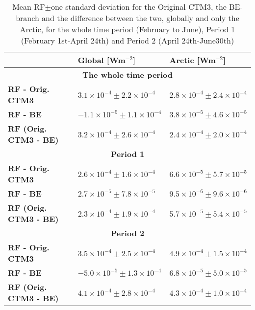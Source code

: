 \begin{table}[h]
\begin{tabular}{|l|l|l|}
\hline
\textbf{}                     & \textbf{Global {[}Wm$^{-2}${]}}        & \textbf{Arctic {[}Wm$^{-2}${]}}       \\ \hline
\multicolumn{3}{|c|}{\textbf{The whole time period}}                                                           \\ \hline
\textbf{RF - Orig. CTM3}      & $3.1\times10^{-4}\pm2.2\times10^{-4}$  & $2.8\times10^{-4}\pm2.4\times10^{-4}$ \\
\textbf{RF - BE}              & $-1.1\times10^{-5}\pm1.1\times10^{-4}$ & $3.8\times10^{-5}\pm4.6\times10^{-5}$ \\
\textbf{RF (Orig. CTM3 - BE)} & $3.2\times10^{-4}\pm2.6\times10^{-4}$  & $2.4\times10^{-4}\pm2.0\times10^{-4}$ \\ \hline
\multicolumn{3}{|c|}{\textbf{Period 1}}                                                                        \\ \hline
\textbf{RF - Orig. CTM3}      & $2.6\times10^{-4}\pm1.6\times10^{-4}$  & $6.6\times10^{-5}\pm5.7\times10^{-5}$ \\
\textbf{RF - BE}              & $2.7\times10^{-5}\pm7.8\times10^{-5}$  & $9.5\times10^{-6}\pm9.6\times10^{-6}$ \\
\textbf{RF (Orig. CTM3 - BE)} & $2.3\times10^{-4}\pm1.9\times10^{-4}$  & $5.7\times10^{-5}\pm5.4\times10^{-5}$ \\ \hline
\multicolumn{3}{|c|}{\textbf{Period 2}}                                                                        \\ \hline
\textbf{RF - Orig. CTM3}      & $3.5\times10^{-4}\pm2.5\times10^{-4}$  & $4.9\times10^{-4}\pm1.5\times10^{-4}$ \\
\textbf{RF - BE}              & $-5.0\times10^{-5}\pm1.3\times10^{-4}$ & $6.8\times10^{-5}\pm5.0\times10^{-5}$ \\
\textbf{RF (Orig. CTM3 - BE)} & $4.1\times10^{-4}\pm2.8\times10^{-4}$  & $4.3\times10^{-4}\pm1.0\times10^{-4}$ \\ \hline
\end{tabular}
\caption{Mean RF$\pm$one standard deviation for the Original CTM3, the BE-branch and the difference between the two, globally and only the Arctic, for the whole time period (February to June), Period 1 (February 1st-April 24th) and Period 2 (April 24th-June30th)}
\label{tab:RF_results}
\end{table}